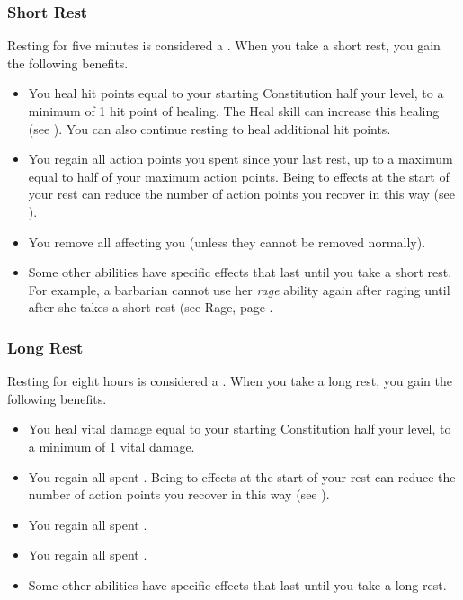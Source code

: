         \subsubsection{Short Rest}\label{Short Rest}
            Resting for five minutes is considered a .
            When you take a short rest, you gain the following benefits.
            \begin{itemize}
                \item You heal hit points equal to your starting Constitution \add half your level, to a minimum of 1 hit point of healing.
                    The Heal skill can increase this healing (see ).
                    You can also continue resting to heal additional hit points.
                \item You regain all action points you spent since your last rest, up to a maximum equal to half of your maximum action points.
                    Being  to effects at the start of your rest can reduce the number of action points you recover in this way (see ).
                \item You remove all  affecting you (unless they cannot be removed normally).
                \item Some other abilities have specific effects that last until you take a short rest.
                    For example, a barbarian cannot use her \textit{rage} ability again after raging until after she takes a short rest (see Rage, page .
            \end{itemize}

        \subsubsection{Long Rest}\label{Long Rest}
            Resting for eight hours is considered a .
            When you take a long rest, you gain the following benefits.
            \begin{itemize}
                \item You heal vital damage equal to your starting Constitution \add half your level, to a minimum of 1 vital damage.
                \item You regain all spent .
                    Being  to effects at the start of your rest can reduce the number of action points you recover in this way (see ).
                \item You regain all spent .
                \item You regain all spent .
                \item Some other abilities have specific effects that last until you take a long rest.
            \end{itemize}

